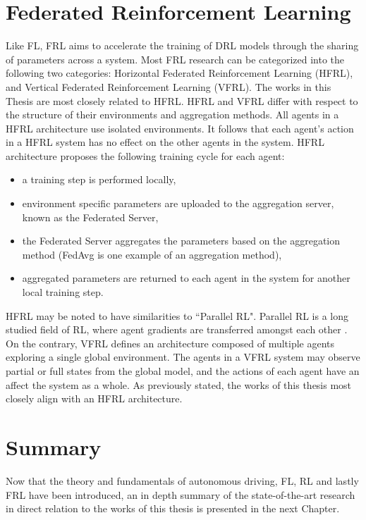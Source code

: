 \section{Federated Reinforcement Learning}
Like FL, FRL aims to accelerate the training of DRL models through the sharing of parameters 
across a system. Most FRL research can be categorized into the following two categories: 
Horizontal Federated Reinforcement Learning (HFRL), and Vertical Federated Reinforcement 
Learning (VFRL).  The works in this Thesis are most closely related to HFRL.  HFRL and VFRL 
differ with respect to the structure of their environments and aggregation methods.  All 
agents in a HFRL architecture use isolated environments. It follows that each agent's action 
in a HFRL system has no effect on the other agents in the system.  HFRL architecture 
proposes the following training cycle for each agent: 

\begin{itemize}
    \item a training step is performed locally, 
    \item environment specific parameters are uploaded to the aggregation server, 
    known as the Federated Server,
    \item the Federated Server aggregates the parameters based on the aggregation 
    method (FedAvg is one example of an aggregation method),
    \item aggregated parameters are returned to each agent in the system for 
    another local training step.
\end{itemize} 

HFRL may be noted to have similarities to ``Parallel RL".  Parallel RL is a long studied 
field of RL, where agent gradients are transferred amongst each other 
\cite{Lim2020, Nadiger2019}.  On the contrary, VFRL defines an architecture composed 
of multiple agents exploring a single global environment. The agents in a VFRL system 
may observe partial or full states from the global model, and the actions of each agent 
have an affect the system as a whole. As previously stated, the works of this thesis most 
closely align with an HFRL architecture.

\section{Summary}
Now that the theory and fundamentals of autonomous driving, FL, RL and lastly FRL 
have been introduced, an in depth summary of the state-of-the-art research in 
direct relation to the works of this thesis is presented in the next Chapter.